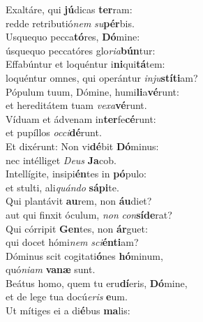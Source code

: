 \evenverse Exaltáre, qui \textbf{jú}dicas \textbf{ter}ram:~\*\\
\evenverse redde retributió\textit{nem} \textit{su}\textbf{pér}bis.\\
\oddverse Usquequo pecca\textbf{tó}res, \textbf{Dó}mine:~\*\\
\oddverse úsquequo peccatóres glo\textit{ri}\textit{a}\textbf{bún}tur:\\
\evenverse Effabúntur et loquéntur i\textbf{ni}qui\textbf{tá}tem:~\*\\
\evenverse loquéntur omnes, qui operántur \textit{in}\textit{ju}\textbf{stí}\textbf{ti}am?\\
\oddverse Pópulum tuum, Dómine, humi\textbf{li}a\textbf{vé}runt:~\*\\
\oddverse et hereditátem tuam \textit{ve}\textit{xa}\textbf{vé}runt.\\
\evenverse Víduam et ádvenam in\textbf{ter}fe\textbf{cé}runt:~\*\\
\evenverse et pupíllos \textit{oc}\textit{ci}\textbf{dé}runt.\\
\oddverse Et dixérunt: Non vi\textbf{dé}bit \textbf{Dó}minus:~\*\\
\oddverse nec intélliget \textit{De}\textit{us} \textbf{Ja}cob.\\
\evenverse Intellígite, insipi\textbf{én}tes in \textbf{pó}pulo:~\*\\
\evenverse et stulti, ali\textit{quán}\textit{do} \textbf{sá}\textbf{pi}te.\\
\oddverse Qui plantávit \textbf{au}rem, non \textbf{áu}diet?~\*\\
\oddverse aut qui finxit óculum, \textit{non} \textit{con}\textbf{sí}\textbf{de}rat?\\
\evenverse Qui córripit \textbf{Gen}tes, non \textbf{ár}guet:~\*\\
\evenverse qui docet hómi\textit{nem} \textit{sci}\textbf{én}\textbf{ti}am?\\
\oddverse Dóminus scit cogitati\textbf{ó}nes \textbf{hó}minum,~\*\\
\oddverse quó\textit{ni}\textit{am} \textbf{va}\textbf{næ} sunt.\\
\evenverse Beátus homo, quem tu eru\textbf{dí}eris, \textbf{Dó}mine,~\*\\
\evenverse et de lege tua docú\textit{e}\textit{ris} \textbf{e}um.\\
\oddverse Ut mítiges ei a di\textbf{é}bus \textbf{ma}lis:~\*\\
